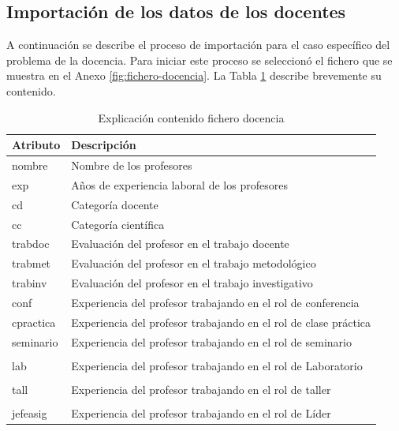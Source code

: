 \subsection{Importación de los datos de los docentes}
A continuación se describe el proceso de importación para el caso específico del problema de la docencia. Para iniciar este proceso se seleccionó el fichero que se muestra en el Anexo \ref{fig:fichero-docencia}. La Tabla \ref{table:importar-fichero-docencia} describe brevemente su contenido.

\begin{table}[H]
	\centering
	\caption{Explicación contenido fichero docencia}\label{table:importar-fichero-docencia}
	\begin{tabular} {l | p{10cm}}
		\toprule
		\textbf{Atributo} & \textbf{Descripción} \\ \midrule
		nombre & Nombre de los profesores \\ \hline
		exp & Años de experiencia laboral de los profesores \\ \hline
		cd & Categoría docente \\ \hline
		cc & Categoría científica \\ \hline
		trabdoc & Evaluación del profesor en el trabajo docente \\ \hline
		trabmet & Evaluación del profesor en el trabajo metodológico\\ \hline
		trabinv & Evaluación del profesor en el trabajo investigativo\\ \hline
		conf & Experiencia del profesor trabajando en el rol de conferencia\\ \hline
		cpractica & Experiencia del profesor trabajando en el rol de clase práctica \\ \hline
		seminario & Experiencia del profesor trabajando en el rol de seminario\\ \hline\\
		lab & Experiencia del profesor trabajando en el rol de Laboratorio\\ \hline\\
		tall & Experiencia del profesor trabajando en el rol de taller \\ \hline\\
		jefeasig & Experiencia del profesor trabajando en el rol de Líder\\ \bottomrule
	\end{tabular}
\end{table}

